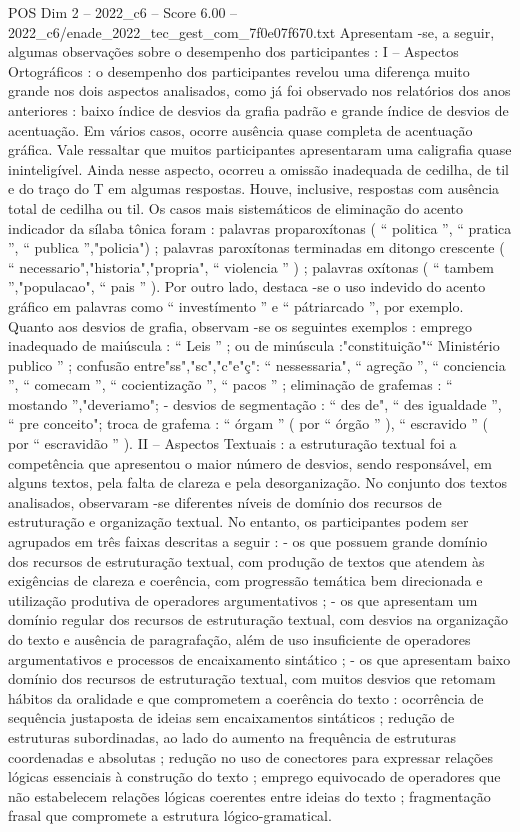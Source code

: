 \begin{textsample}{POS Dim 2 – 2022\_c6 – Score 6.00 – 2022\_c6/enade\_2022\_tec\_gest\_com\_7f0e07f670.txt}
Apresentam -se, a seguir, algumas observações sobre o desempenho dos participantes : I – Aspectos Ortográficos : o desempenho dos participantes revelou uma diferença muito grande nos dois aspectos analisados, como já foi observado nos relatórios dos anos anteriores : baixo índice de desvios da grafia padrão e grande índice de desvios de acentuação.
Em vários casos, ocorre ausência quase completa de acentuação gráfica.
Vale ressaltar que muitos participantes apresentaram uma caligrafia quase ininteligível.
Ainda nesse aspecto, ocorreu a omissão inadequada de cedilha, de til e do traço do T em algumas respostas.
Houve, inclusive, respostas com ausência total de cedilha ou til.
Os casos mais sistemáticos de eliminação do acento indicador da sílaba tônica foram : palavras proparoxítonas ( “ politica ”, “ pratica ”, “ publica ”,"policia") ; palavras paroxítonas terminadas em ditongo crescente ( “ necessario","historia","propria", “ violencia ” ) ; palavras oxítonas ( “ tambem ”,"populacao", “ pais ” ).
Por outro lado, destaca -se o uso indevido do acento gráfico em palavras como “ investímento ” e “ pátriarcado ”, por exemplo.
Quanto aos desvios de grafia, observam -se os seguintes exemplos : emprego inadequado de maiúscula : “ Leis ” ; ou de minúscula :"constituição"“ Ministério publico ” ; confusão entre"ss","sc","c"e"ç": “ nessessaria", “ agreção ”, “ conciencia ”, “ comecam ”, “ cocientização ”, “ pacos ” ; eliminação de grafemas : “ mostando ”,"deveriamo"; - desvios de segmentação : “ des de", “ des igualdade ”, “ pre conceito"; troca de grafema : “ órgam ” ( por “ órgão ” ), “ escravido ” ( por “ escravidão ” ).
II – Aspectos Textuais : a estruturação textual foi a competência que apresentou o maior número de desvios, sendo responsável, em alguns textos, pela falta de clareza e pela desorganização.
No conjunto dos textos analisados, observaram -se diferentes níveis de domínio dos recursos de estruturação e organização textual.
No entanto, os participantes podem ser agrupados em três faixas descritas a seguir : - os que possuem grande domínio dos recursos de estruturação textual, com produção de textos que atendem às exigências de clareza e coerência, com progressão temática bem direcionada e utilização produtiva de operadores argumentativos ; - os que apresentam um domínio regular dos recursos de estruturação textual, com desvios na organização do texto e ausência de paragrafação, além de uso insuficiente de operadores argumentativos e processos de encaixamento sintático ; - os que apresentam baixo domínio dos recursos de estruturação textual, com muitos desvios que retomam hábitos da oralidade e que comprometem a coerência do texto : ocorrência de sequência justaposta de ideias sem encaixamentos sintáticos ; redução de estruturas subordinadas, ao lado do aumento na frequência de estruturas coordenadas e absolutas ; redução no uso de conectores para expressar relações lógicas essenciais à construção do texto ; emprego equivocado de operadores que não estabelecem relações lógicas coerentes entre ideias do texto ; fragmentação frasal que compromete a estrutura lógico-gramatical.

\end{textsample}
